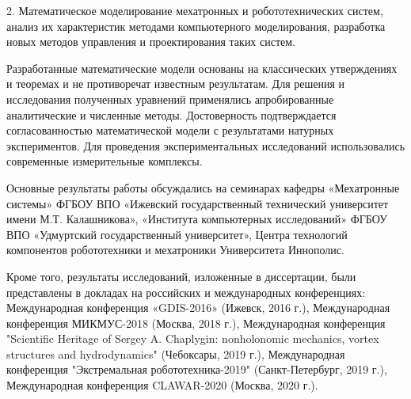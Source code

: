 2. Математическое моделирование мехатронных и робототехнических систем, анализ их характеристик методами компьютерного моделирования, разработка новых методов управления и проектирования таких систем.

{\reliability} Разработанные математические модели основаны на классических утверждениях и теоремах и не противоречат известным результатам. Для решения и исследования полученных уравнений применялись апробированные аналитические и численные методы. Достоверность подтверждается согласованностью математической модели с результатами натурных экспериментов. Для проведения экспериментальных исследований использовались современные измерительные комплексы.


{\probation}
Основные результаты работы обсуждались на семинарах кафедры «Мехатронные системы» ФГБОУ ВПО «Ижевский государственный технический университет имени М.Т. Калашникова», «Института компьютерных исследований» ФГБОУ ВПО «Удмуртский государственный университет», Центра технологий компонентов робототехники и мехатроники Университета Иннополис.

Кроме того, результаты исследований, изложенные в диссертации, были представлены в докладах на российских и международных конференциях:
Международная конференция «GDIS-2016» (Ижевск, 2016 г.), Международная конференция МИКМУС-2018 (Москва, 2018 г.), Международная конференция "Scientific Heritage of Sergey A. Chaplygin: nonholonomic mechanics, vortex structures and hydrodynamics" (Чебоксары, 2019 г.), Международная конференция "Экстремальная робототехника-2019" (Санкт-Петербург, 2019 г.), Международная конференция CLAWAR-2020 (Москва, 2020 г.).

%	
%	
%	
%	


